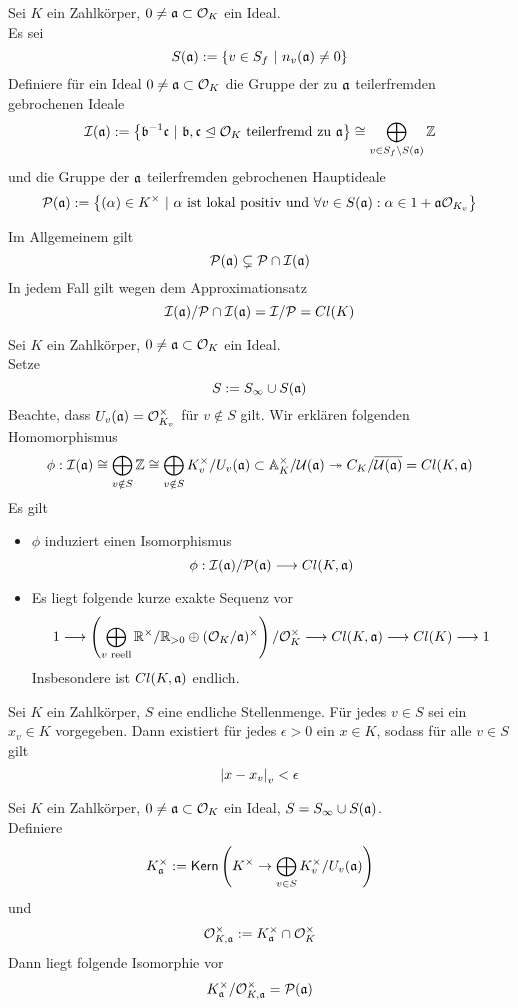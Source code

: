 Sei $K$ ein Zahlkörper, $0\neq \mathfrak{a} \subset \mathcal{O}_K$ ein Ideal.\\
Es sei
\[ S(\af) := \set{v \in S_f}{n_v(\af) \neq 0} \]
Definiere für ein Ideal $0\neq \mathfrak{a} \subset \mathcal{O}_K$ die Gruppe der zu $\mathfrak{a}$ teilerfremden gebrochenen Ideale
\[ \I(\af) := \set{\bf\i \cf}{\bf,\cf \trianglelefteq \O_K \text{ teilerfremd zu } \af} \isom{} \bigoplus_{v\in S_f \setminus S(\af)}\Z \]
und die Gruppe der $\mathfrak{a}$ teilerfremden gebrochenen Hauptideale
\[ \P(\af) := \set{(\alpha) \in K^\times}{\alpha \text{ ist lokal positiv und }\forall v \in S(\af): \alpha \in 1 + \af\O_{K_v}}  \]

\Bem{}
Im Allgemeinem gilt
\[ \mathcal{P}(\mathfrak{a}) \subsetneq \mathcal{P} \cap \mathcal{I}(\mathfrak{a}) \]
In jedem Fall gilt wegen dem Approximationsatz
\[ \mathcal{I}(\mathfrak{a}) / \mathcal{P} \cap \mathcal{I}(\mathfrak{a}) = \mathcal{I} / \mathcal{P} = Cl(K) \]

\Satz{}
Sei $K$ ein Zahlkörper, $0\neq \mathfrak{a} \subset \mathcal{O}_K$ ein Ideal.\\
Setze
\[ S:= S_\infty \cup S(\mathfrak{a}) \]
Beachte, dass $U_v(\mathfrak{a}) = \mathcal{O}_{K_v}^\times$ für $v \notin S$ gilt. Wir erklären folgenden Homomorphismus
\begin{align*}
\phi : \mathcal{I}(\mathfrak{a}) \overset{}{\cong} \bigoplus_{v\notin S} \mathbb{Z} \overset{}{\cong} \bigoplus_{v\notin S} K_v^\times / U_v(\mathfrak{a}) \subset \mathbb{A}_K^\times / \mathcal{U}(\mathfrak{a}) \overset{}{\twoheadrightarrow} C_K / \overline{\mathcal{U}(\mathfrak{a})} = Cl(K,\mathfrak{a})  
\end{align*}
Es gilt
\begin{itemize}
\item $\phi$ induziert einen Isomorphismus
\[ \phi : \mathcal{I}(\mathfrak{a}) / \mathcal{P}(\mathfrak{a}) \overset{}{\longrightarrow} Cl(K,\mathfrak{a}) \]
\item Es liegt folgende kurze exakte Sequenz vor
\[ 1 \overset{}{\longrightarrow} \left( \bigoplus_{v \text{ reell}} \mathbb{R}^\times / \mathbb{R}_{>0} \oplus (\mathcal{O}_K / \mathfrak{a})^\times \right) / \mathcal{O}_K^\times \overset{}{\longrightarrow} Cl(K,\mathfrak{a}) \overset{}{\longrightarrow} Cl(K) \overset{}{\longrightarrow} 1 \]
Insbesondere ist $Cl(K,\mathfrak{a})$ endlich.
\end{itemize}

Sei $K$ ein Zahlkörper, $S$ eine endliche Stellenmenge. Für jedes $v \in S$ sei ein $x_v \in K$ vorgegeben. Dann existiert für jedes $\epsilon >0$ ein $x \in K$, sodass für alle $v \in S$ gilt
\[ \left|x-x_v\right|_v < \epsilon \]

\Def{}
Sei $K$ ein Zahlkörper, $0\neq \mathfrak{a} \subset \mathcal{O}_K$ ein Ideal, $S = S_\infty \cup S(\mathfrak{a})$.\\
Definiere
\[ K_{\mathfrak{a}}^\times := \textsf{Kern}\left( K^\times \overset{}{\rightarrow} \bigoplus_{v\in S } K_v^\times / U_v(\mathfrak{a})\right)  \]
und
\[\mathcal{O}_{K,\mathfrak{a}}^\times := K_{\mathfrak{a}}^\times \cap \mathcal{O}_K^\times \]
Dann liegt folgende Isomorphie vor
\[ K_{\mathfrak{a}}^\times / \mathcal{O}_{K,\mathfrak{a}}^\times = \mathcal{P}(\mathfrak{a}) \]


